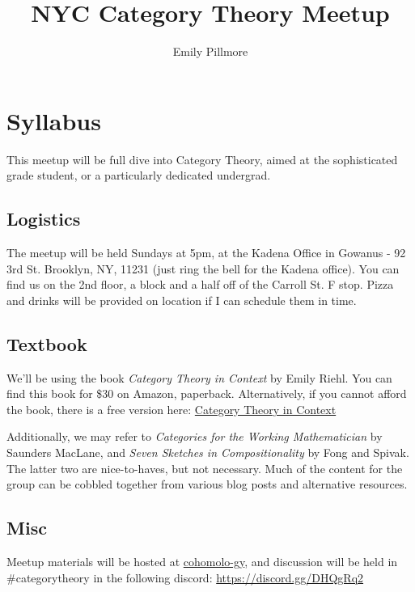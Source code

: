 \documentclass[11pt, oneside]{article}   	%
\title{NYC Category Theory Meetup}
\author{Emily Pillmore}
\begin{document}
\maketitle
\section{Syllabus}

This meetup will be full dive into Category Theory, aimed at the sophisticated grade student, or a particularly dedicated undergrad.

\subsection{Logistics}

The meetup will be held Sundays at 5pm, at the Kadena Office in Gowanus - 92 3rd St. Brooklyn, NY, 11231 (just ring the bell for the Kadena office). You can find us on the 2nd floor, a block and a half off of the Carroll St. F stop. Pizza and drinks will be provided on location if I can schedule them in time.

\subsection{Textbook}

We'll be using the book \textit{Category Theory in Context} by Emily Riehl. You can find this book for \$30 on Amazon, paperback. Alternatively, if you cannot afford the book, there is a free version here: \href{http://www.math.jhu.edu/eriehl/context.pdf}{Category Theory in Context}

Additionally, we may refer to \textit{Categories for the Working Mathematician} by Saunders MacLane, and \textit{Seven Sketches in Compositionality} by Fong and Spivak. The latter two are nice-to-haves, but not necessary. Much of the content for the group can be cobbled together from various blog posts and alternative resources.

\subsection{Misc}

Meetup materials will be hosted at \href{https://github.com/cohomolo-gy/cats-in-context}{cohomolo-gy}, and discussion will be held in \#categorytheory in the following discord: \href{Haskell $\cap$ Chat}{https://discord.gg/DHQgRq2}
\end{document}
